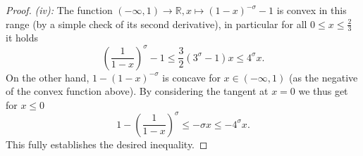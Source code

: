 \documentclass[]{interact}
\newcommand{\bbR}{\mathbb{R}}
\newcommand{\ra}{\rightarrow}
\theoremstyle{definition}
\numberwithin{table}{section} %
\numberwithin{figure}{section}
\begin{document}
\begin{proof}
    \textit{(iv):} The function $(-\infty, 1) \ra \bbR, x \mapsto (1-x)^{-\sigma}-1$ is convex in this range (by a simple check of its second derivative), in particular for all $0 \leq x \leq \frac23$ it holds
    $$
    \left(\frac1{1-x}\right)^\sigma - 1 \leq \frac32 (3^\sigma-1)x \leq 4^\sigma x.
    $$
    On the other hand, $1-(1-x)^{-\sigma}$ is concave for $x \in (-\infty, 1)$ (as the negative of the convex function above). By considering the tangent at $x=0$ we thus get for $x\leq0$
    $$
    1-\left(\frac1{1-x}\right)^\sigma \leq -\sigma x \leq -4^\sigma x.
    $$
    This fully establishes the desired inequality.
\end{proof}
\end{document}
